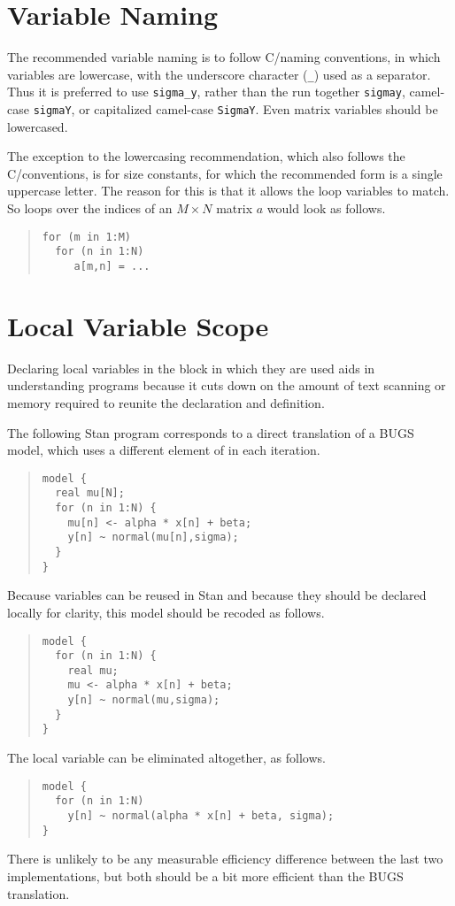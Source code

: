 \section{Variable Naming}

The recommended variable naming is to follow C/\Cpp naming
conventions, in which variables are lowercase, with the underscore
character (\Verb|_|) used as a separator.  Thus it is preferred to use
\Verb|sigma_y|, rather than the run together \Verb|sigmay|, camel-case
\Verb|sigmaY|, or capitalized camel-case \Verb|SigmaY|.  Even matrix
variables should be lowercased.

The exception to the lowercasing recommendation, which also follows
the C/\Cpp conventions, is for size constants, for which the
recommended form is a single uppercase letter.  The reason for this is
that it allows the loop variables to match.  So loops over the indices of
an $M \times N$ matrix $a$ would look as follows.
%
\begin{quote}
\begin{Verbatim}
for (m in 1:M)
  for (n in 1:N)
     a[m,n] = ...
\end{Verbatim}
\end{quote}


\section{Local Variable Scope}

Declaring local variables in the block in which they are used aids in
understanding programs because it cuts down on the amount of text
scanning or memory required to reunite the declaration and definition.

The following Stan program corresponds to a direct translation of a
BUGS model, which uses a different element of  in each
iteration.
%
\begin{quote}
\begin{Verbatim}
model {
  real mu[N];
  for (n in 1:N) {
    mu[n] <- alpha * x[n] + beta;
    y[n] ~ normal(mu[n],sigma);
  }
}
\end{Verbatim}
\end{quote}
%
Because variables can be reused in Stan and because they should be
declared locally for clarity, this model should be recoded as follows.
%
\begin{quote}
\begin{Verbatim} 
model {
  for (n in 1:N) {
    real mu;
    mu <- alpha * x[n] + beta;
    y[n] ~ normal(mu,sigma);
  }
}
\end{Verbatim}
\end{quote}
% 
The local variable can be eliminated altogether, as follows.
%
\begin{quote}
\begin{Verbatim}
model {
  for (n in 1:N)
    y[n] ~ normal(alpha * x[n] + beta, sigma);
}
\end{Verbatim}
\end{quote}
%
There is unlikely to be any measurable efficiency difference
between the last two implementations, but both should be a bit
more efficient than the BUGS translation.

